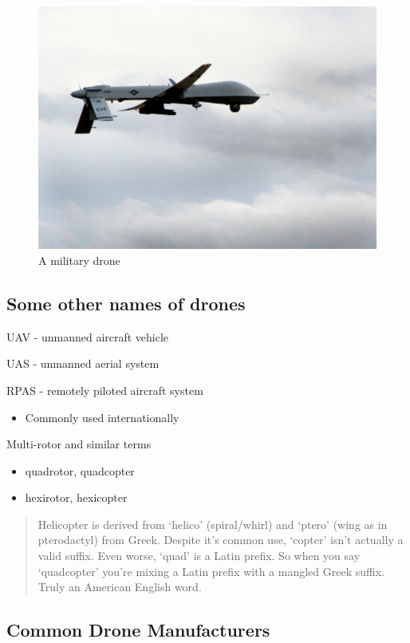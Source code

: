 \documentclass[
]{book}
\providecommand{\tightlist}{%
  \setlength{\itemsep}{0pt}\setlength{\parskip}{0pt}}
\theoremstyle{definition}
\theoremstyle{definition}
\theoremstyle{definition}
\theoremstyle{remark}
\begin{document}
\begin{figure}

{\centering \includegraphics[width=0.5\linewidth]{images/general/military_drone} 

}

\caption{A military drone}\label{fig:militarydrone}
\end{figure}

\hypertarget{some-other-names-of-drones}{%
\subsection{Some other names of drones}\label{some-other-names-of-drones}}

UAV - unmanned aircraft vehicle

UAS - unmanned aerial system

RPAS - remotely piloted aircraft system

\begin{itemize}
\tightlist
\item
  Commonly used internationally
\end{itemize}

Multi-rotor and similar terms

\begin{itemize}
\tightlist
\item
  quadrotor, quadcopter
\item
  hexirotor, hexicopter
\end{itemize}

\begin{quote}
Helicopter is derived from `helico' (spiral/whirl) and `ptero' (wing as in pterodactyl) from Greek. Despite it's common use, `copter' isn't actually a valid suffix. Even worse, `quad' is a Latin prefix. So when you say `quadcopter' you're mixing a Latin prefix with a mangled Greek suffix. Truly an American English word.
\end{quote}

\hypertarget{common-drone-manufacturers}{%
\subsection{Common Drone Manufacturers}\label{common-drone-manufacturers}}
\end{document}
